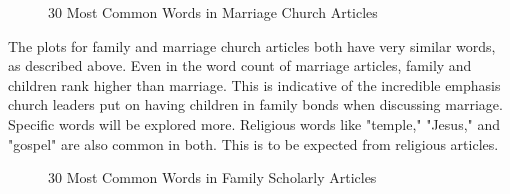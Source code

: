 \documentclass[twocolumn]{article}
\begin{document}
\begin{figure}[h]
    \centering
    \caption{30 Most Common Words in Marriage Church Articles}
    \label{fig:mcwc}
\end{figure}

The plots for family and marriage church articles both have very similar words, as described above. Even in the word count of marriage articles, family and children rank higher than marriage. This is indicative of the incredible emphasis church leaders put on having children in family bonds when discussing marriage. Specific words will be explored more. Religious words like "temple," "Jesus," and "gospel" are also common in both. This is to be expected from religious articles.%

\begin{figure}[h]
    \centering
    \caption{30 Most Common Words in Family Scholarly Articles}
    \label{fig:fswc}
\end{figure}
\end{document}
